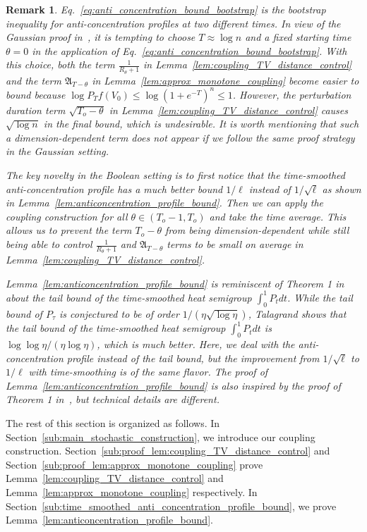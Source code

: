 \documentclass[11pt]{article}
\newcommand{\fA}{\mathfrak{A}}
\newcommand{\uV}{V}
\newcommand{\To}{{T_o}}
\theoremstyle{named}
\theoremstyle{plain}
\newtheorem{remark}{Remark}
\begin{document}
\begin{remark}
  Eq.~\eqref{eq:anti_concentration_bound_bootstrap} is the bootstrap inequality for anti-concentration profiles at two different times. In view of the Gaussian proof in~\cite{eldan2018regularization}, it is tempting to choose $T \approx \log n$ and a fixed starting time $\theta = 0$ in the application of Eq.~\eqref{eq:anti_concentration_bound_bootstrap}. With this choice, both the term $\frac{1}{R_\theta + 1}$ in Lemma~\ref{lem:coupling_TV_distance_control} and the term $\fA_{T-\theta}$ in Lemma~\ref{lem:approx_monotone_coupling} become easier to bound because $\log P_T f(\uV_0) \leq \log (1+e^{-T})^n \leq 1$. However, the perturbation duration term $\sqrt{\To - \theta}$ in Lemma~\ref{lem:coupling_TV_distance_control} causes $\sqrt{\log n}$ in the final bound, which is undesirable. It is worth mentioning that such a dimension-dependent term does not appear if we follow the same proof strategy in the Gaussian setting. 
  
  The key novelty in the Boolean setting is to first notice that the time-smoothed anti-concentration profile has a much better bound $1/\ell$ instead of $1/\sqrt{\ell}$ as shown in Lemma~\ref{lem:anticoncentration_profile_bound}. Then we can apply the coupling construction for all $\theta \in (\To - 1, \To)$ and take the time average. This allows us to prevent the term $\To - \theta$ from being dimension-dependent while still being able to control $\frac{1}{R_\theta + 1}$ and $\fA_{T-\theta}$ terms to be small on average in Lemma~\ref{lem:coupling_TV_distance_control}.

  Lemma~\ref{lem:anticoncentration_profile_bound} is reminiscent of Theorem 1 in~\cite{talagrand1989conjecture} about the tail bound of the time-smoothed heat semigroup $\int_0^1 P_t dt$. While the tail bound of $P_\tau$ is conjectured to be of order $1/(\eta \sqrt{\log \eta})$, Talagrand shows that the tail bound of the time-smoothed heat semigroup $\int_0^1 P_t dt$ is $\log\log \eta / (\eta \log \eta)$, which is much better. Here, we deal with the anti-concentration profile instead of the tail bound, but the improvement from $1/\sqrt{\ell}$ to $1/\ell$ with time-smoothing is of the same flavor. The proof of Lemma~\ref{lem:anticoncentration_profile_bound} is also inspired by the proof of Theorem 1 in~\cite{talagrand1989conjecture}, but technical details are different. 
  \end{remark}

The rest of this section is organized as follows. In Section~\ref{sub:main_stochastic_construction}, we introduce our coupling construction.  Section~\ref{sub:proof_lem:coupling_TV_distance_control} and Section~\ref{sub:proof_lem:approx_monotone_coupling} prove Lemma~\ref{lem:coupling_TV_distance_control} and Lemma~\ref{lem:approx_monotone_coupling} respectively. In Section~\ref{sub:time_smoothed_anti_concentration_profile_bound}, we prove Lemma~\ref{lem:anticoncentration_profile_bound}.
\end{document}

